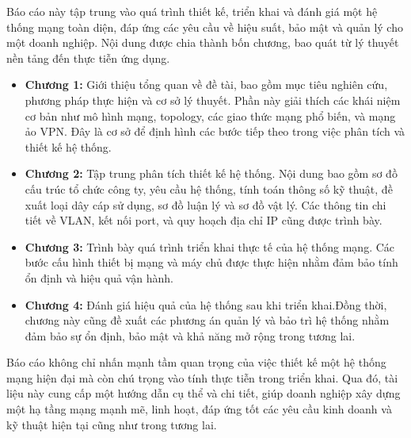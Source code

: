 \documentclass[13pt]{report}
\begin{document}
    Báo cáo này tập trung vào quá trình thiết kế, triển khai và đánh giá một hệ thống mạng toàn diện, đáp ứng các yêu cầu về hiệu suất, bảo mật và quản lý cho một doanh nghiệp. Nội dung được chia thành bốn chương, bao quát từ lý thuyết nền tảng đến thực tiễn ứng dụng.
    \begin{itemize}
        \item \textbf{Chương 1:} Giới thiệu tổng quan về đề tài, bao gồm mục tiêu nghiên cứu, phương pháp thực hiện và cơ sở lý thuyết. Phần này giải thích các khái niệm cơ bản như mô hình mạng, topology, các giao thức mạng phổ biến, và mạng ảo VPN. Đây là cơ sở để định hình các bước tiếp theo trong việc phân tích và thiết kế hệ thống.
        \item \textbf{Chương 2:} Tập trung phân tích thiết kế hệ thống. Nội dung bao gồm sơ đồ cấu trúc tổ chức công ty, yêu cầu hệ thống, tính toán thông số kỹ thuật, đề xuất loại dây cáp sử dụng, sơ đồ luận lý và sơ đồ vật lý. Các thông tin chi tiết về VLAN, kết nối port, và quy hoạch địa chỉ IP cũng được trình bày.
        \item \textbf{Chương 3:} Trình bày quá trình triển khai thực tế của hệ thống mạng. Các bước cấu hình thiết bị mạng và máy chủ được thực hiện nhằm đảm bảo tính ổn định và hiệu quả vận hành.
        \item \textbf{Chương 4:} Đánh giá hiệu quả của hệ thống sau khi triển khai.Đồng thời, chương này cũng đề xuất các phương án quản lý và bảo trì hệ thống nhằm đảm bảo sự ổn định, bảo mật và khả năng mở rộng trong tương lai.
    \end{itemize}

    Báo cáo không chỉ nhấn mạnh tầm quan trọng của việc thiết kế một hệ thống mạng hiện đại mà còn chú trọng vào tính thực tiễn trong triển khai. Qua đó, tài liệu này cung cấp một hướng dẫn cụ thể và chi tiết, giúp doanh nghiệp xây dựng một hạ tầng mạng mạnh mẽ, linh hoạt, đáp ứng tốt các yêu cầu kinh doanh và kỹ thuật hiện tại cũng như trong tương lai.

   \newpage
    \begin{center}
        \tableofcontents
        \newpage
        \listoffigures %
        \newpage
        \listoftables
    \end{center}

    
    \newpage
    
  
    \newpage

    

    \newpage
    
\end{document}

